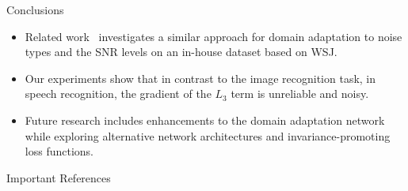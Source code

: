 \documentclass[final]{beamer}
\newlength{\onecolwid}
\begin{document}
\begin{frame}[t]
\begin{columns}[t]
\begin{column}{\onecolwid}
\begin{block}{Conclusions}
\begin{itemize}
        \item Related work~\cite{yusuke2016adversarial} investigates a similar approach for domain 
            adaptation to noise types and the SNR levels on an in-house dataset based on WSJ.
        
        \item Our experiments show that in contrast to the image recognition task, in speech recognition, the 
    gradient of the $L_3$ term is unreliable and noisy. 
    
        \item Future research includes enhancements to the domain adaptation network while exploring 
            alternative network architectures and invariance-promoting loss functions.
    \end{itemize}
\end{block}
\begin{block}{Important References}
    
    
\end{block}




\end{column} %

\end{columns} %

\end{frame} %
\end{document}
